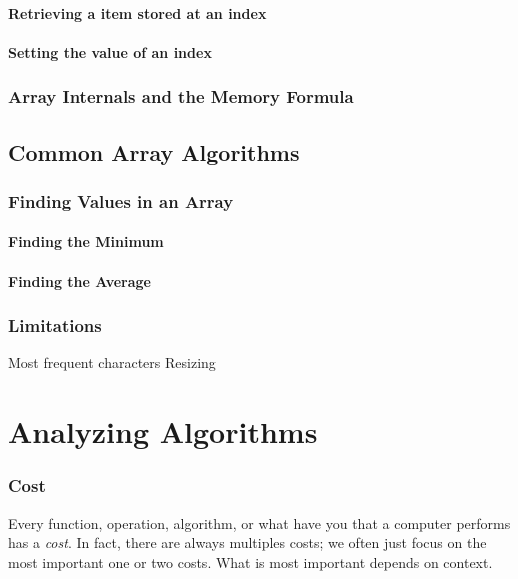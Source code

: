 \documentclass[10pt,a4paper]{book}
\begin{document}
\subsubsection{Retrieving a item stored at an index}

\subsubsection{Setting the value of an index}

\subsection{Array Internals and the Memory Formula}

\section{Common Array Algorithms}

\subsection{Finding Values in an Array}
\subsubsection{Finding the Minimum}

\subsubsection{Finding the Average}


\subsection{Limitations}
Most frequent characters
Resizing



\chapter{Analyzing Algorithms}

\subsection{Cost}
Every function, operation, algorithm, or what have you that a computer performs has a \emph{cost}. In fact, there are always multiples costs;  we often just focus on the most important one or two costs.  
What is most important depends on context.
\end{document}
